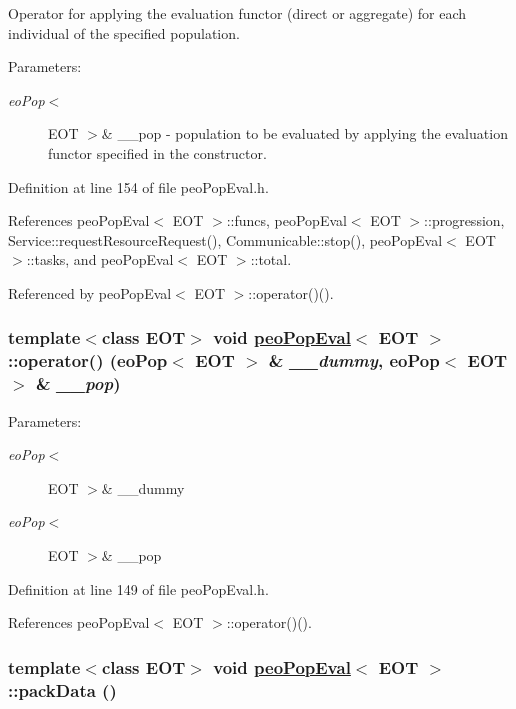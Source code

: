 Operator for applying the evaluation functor (direct or aggregate) for each individual of the specified population. 

\begin{Desc}
\item[Parameters:]
\begin{description}
\item[{\em eo\-Pop$<$}]EOT $>$\& \_\-\_\-pop - population to be evaluated by applying the evaluation functor specified in the constructor. \end{description}
\end{Desc}


Definition at line 154 of file peo\-Pop\-Eval.h.

References peo\-Pop\-Eval$<$ EOT $>$::funcs, peo\-Pop\-Eval$<$ EOT $>$::progression, Service::request\-Resource\-Request(), Communicable::stop(), peo\-Pop\-Eval$<$ EOT $>$::tasks, and peo\-Pop\-Eval$<$ EOT $>$::total.

Referenced by peo\-Pop\-Eval$<$ EOT $>$::operator()().\hypertarget{classpeoPopEval_fd942c2b66f31c7d12a9ad48f1529a16}{
\subsubsection[operator()]{\setlength{\rightskip}{0pt plus 5cm}template$<$class EOT$>$ void \hyperlink{classpeoPopEval}{peo\-Pop\-Eval}$<$ EOT $>$::operator() (eo\-Pop$<$ EOT $>$ \& {\em \_\-\_\-dummy}, eo\-Pop$<$ EOT $>$ \& {\em \_\-\_\-pop})}}
\label{classpeoPopEval_fd942c2b66f31c7d12a9ad48f1529a16}


\begin{Desc}
\item[Parameters:]
\begin{description}
\item[{\em eo\-Pop$<$}]EOT $>$\& \_\-\_\-dummy \item[{\em eo\-Pop$<$}]EOT $>$\& \_\-\_\-pop \end{description}
\end{Desc}


Definition at line 149 of file peo\-Pop\-Eval.h.

References peo\-Pop\-Eval$<$ EOT $>$::operator()().\hypertarget{classpeoPopEval_95351dcd81d1bf878d839e52a02a902d}{
\subsubsection[packData]{\setlength{\rightskip}{0pt plus 5cm}template$<$class EOT$>$ void \hyperlink{classpeoPopEval}{peo\-Pop\-Eval}$<$ EOT $>$::pack\-Data ()}}
\label{classpeoPopEval_95351dcd81d1bf878d839e52a02a902d}


